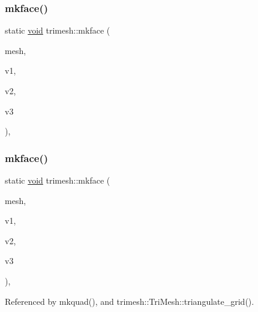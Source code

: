 \subsubsection{\texorpdfstring{mkface()}{mkface()}\hspace{0.1cm}{\footnotesize\ttfamily [1/2]}}
{\footnotesize\ttfamily static \hyperlink{namespacetrimesh_a784ddfd979e1c579bda795a8edfc3f43}{void} trimesh\+::mkface (\begin{DoxyParamCaption}\item[{\hyperlink{classtrimesh_1_1TriMesh}{Tri\+Mesh} $\ast$}]{mesh,  }\item[{int}]{v1,  }\item[{int}]{v2,  }\item[{int}]{v3 }\end{DoxyParamCaption})\hspace{0.3cm}{\ttfamily [inline]}, {\ttfamily [static]}}

\mbox{\label{namespacetrimesh_abed27f847d576c8a6090bc7935114b4c}} 
\subsubsection{\texorpdfstring{mkface()}{mkface()}\hspace{0.1cm}{\footnotesize\ttfamily [2/2]}}
{\footnotesize\ttfamily static \hyperlink{namespacetrimesh_a784ddfd979e1c579bda795a8edfc3f43}{void} trimesh\+::mkface (\begin{DoxyParamCaption}\item[{\hyperlink{classtrimesh_1_1TriMesh}{Tri\+Mesh} $\ast$}]{mesh,  }\item[{int}]{v1,  }\item[{int}]{v2,  }\item[{int}]{v3 }\end{DoxyParamCaption})\hspace{0.3cm}{\ttfamily [inline]}, {\ttfamily [static]}}



Referenced by mkquad(), and trimesh\+::\+Tri\+Mesh\+::triangulate\+\_\+grid().

\mbox{\label{namespacetrimesh_ad38d7032f723a9a20582c31e38b9da61}} 
